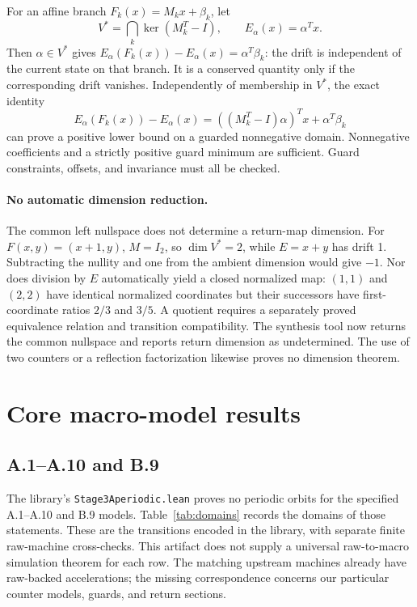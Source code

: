 \documentclass[11pt]{article}
\DeclareRobustCommand{\_}{\ifmmode\sb\else\textunderscore\allowbreak\fi}
\theoremstyle{definition}
\theoremstyle{remark}
\begin{document}
For an affine branch $F_k(x)=M_kx+\beta_k$, let
\[
V^*=\bigcap_k\ker(M_k^T-I),\qquad E_\alpha(x)=\alpha^Tx.
\]
Then $\alpha\in V^*$ gives $E_\alpha(F_k(x))-E_\alpha(x)=\alpha^T\beta_k$: the drift is independent of the current state on that branch. It is a conserved quantity only if the corresponding drift vanishes. Independently of membership in $V^*$, the exact identity
\[
E_\alpha(F_k(x))-E_\alpha(x)
=((M_k^T-I)\alpha)^Tx+\alpha^T\beta_k
\]
can prove a positive lower bound on a guarded nonnegative domain. Nonnegative coefficients and a strictly positive guard minimum are sufficient. Guard constraints, offsets, and invariance must all be checked.

\paragraph{No automatic dimension reduction.}
The common left nullspace does not determine a return-map dimension. For $F(x,y)=(x+1,y)$, $M=I_2$, so $\dim V^*=2$, while $E=x+y$ has drift 1. Subtracting the nullity and one from the ambient dimension would give $-1$. Nor does division by $E$ automatically yield a closed normalized map: $(1,1)$ and $(2,2)$ have identical normalized coordinates but their successors have first-coordinate ratios $2/3$ and $3/5$. A quotient requires a separately proved equivalence relation and transition compatibility. The synthesis tool now returns the common nullspace and reports return dimension as undetermined. The use of two counters or a reflection factorization likewise proves no dimension theorem.

\section{Core macro-model results}
\label{sec:core}
\subsection{A.1--A.10 and B.9}
The library's \texttt{Stage3Aperiodic.lean} proves no periodic orbits for the specified A.1--A.10 and B.9 models. Table~\ref{tab:domains} records the domains of those statements. These are the transitions encoded in the library, with separate finite raw-machine cross-checks. This artifact does not supply a universal raw-to-macro simulation theorem for each row. The matching upstream machines already have raw-backed accelerations; the missing correspondence concerns our particular counter models, guards, and return sections.
\end{document}
